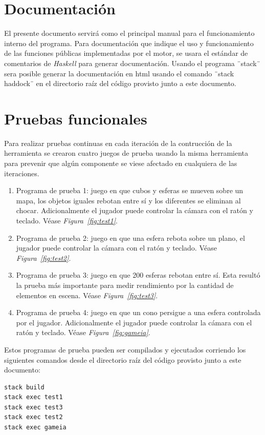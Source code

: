 \section{Documentación}

El presente documento servirá como el principal manual para el funcionamiento interno del programa. Para documentación que indique el uso y funcionamiento de las funciones públicas implementadas por el motor, se usara el estándar de comentarios de \emph{Haskell} para generar documentación. Usando el programa ¨stack¨ sera posible generar la documentación en html usando el comando ¨stack haddock¨ en el directorio raíz del código provisto junto a este documento.

\section{Pruebas funcionales}

Para realizar pruebas continuas en cada iteración de la contrucción de la herramienta se crearon cuatro juegos de prueba usando la misma herramienta para prevenir que algún componente se viese afectado en cualquiera de las iteraciones.

\begin{enumerate}
  \item Programa de prueba 1: juego en que cubos y esferas se mueven sobre un mapa, los objetos iguales rebotan entre sí y los diferentes se eliminan al chocar. Adicionalmente el jugador puede controlar la cámara con el ratón y teclado. Véase \emph{Figura~\ref{fig:test1}}.
  \item Programa de prueba 2: juego en que una esfera rebota sobre un plano, el jugador puede controlar la cámara con el ratón y teclado. Véase \emph{Figura~\ref{fig:test2}}.
  \item Programa de prueba 3: juego en que 200 esferas rebotan entre sí. Esta resultó la prueba más importante para medir rendimiento por la cantidad de elementos en escena. Véase \emph{Figura~\ref{fig:test3}}.
  \item Programa de prueba 4: juego en que un cono persigue a una esfera controlada por el jugador. Adicionalmente el jugador puede controlar la cámara con el ratón y teclado. Véase \emph{Figura~\ref{fig:gameia}}.
\end{enumerate}

Estos programas de prueba pueden ser compilados y ejecutados corriendo los siguientes comandos desde el directorio raíz del código provisto junto a este documento:

\begin{lstlisting}[frame=single,language=Haskell]
stack build
stack exec test1
stack exec test3
stack exec test2
stack exec gameia
\end{lstlisting}
